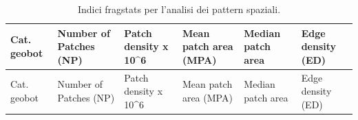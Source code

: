 \documentclass[
]{book}
\begin{document}
\begin{longtable}[]{@{}
  >{\raggedleft\arraybackslash}p{}
  >{\raggedleft\arraybackslash}p{}
  >{\raggedleft\arraybackslash}p{}
  >{\raggedleft\arraybackslash}p{}
  >{\raggedleft\arraybackslash}p{}
  >{\raggedleft\arraybackslash}p{}@{}}
\caption{\label{tab:fragIndex1} Indici fragstats per l'analisi dei pattern spaziali.}\tabularnewline
\toprule\noalign{}
\begin{minipage}[b]{\linewidth}\raggedleft
Cat. geobot
\end{minipage} & \begin{minipage}[b]{\linewidth}\raggedleft
Number of Patches (NP)
\end{minipage} & \begin{minipage}[b]{\linewidth}\raggedleft
Patch density x 10\^{}6
\end{minipage} & \begin{minipage}[b]{\linewidth}\raggedleft
Mean patch area (MPA)
\end{minipage} & \begin{minipage}[b]{\linewidth}\raggedleft
Median patch area
\end{minipage} & \begin{minipage}[b]{\linewidth}\raggedleft
Edge density (ED)
\end{minipage} \\
\midrule\noalign{}
\endfirsthead
\toprule\noalign{}
\begin{minipage}[b]{\linewidth}\raggedleft
Cat. geobot
\end{minipage} & \begin{minipage}[b]{\linewidth}\raggedleft
Number of Patches (NP)
\end{minipage} & \begin{minipage}[b]{\linewidth}\raggedleft
Patch density x 10\^{}6
\end{minipage} & \begin{minipage}[b]{\linewidth}\raggedleft
Mean patch area (MPA)
\end{minipage} & \begin{minipage}[b]{\linewidth}\raggedleft
Median patch area
\end{minipage} & \begin{minipage}[b]{\linewidth}\raggedleft
Edge density (ED)

\end{minipage}
\end{longtable}
\end{document}

